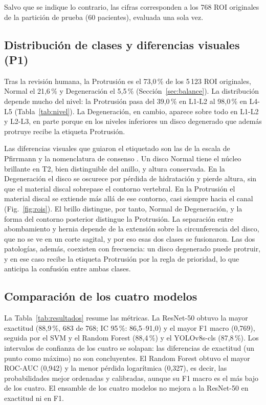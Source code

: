 Salvo que se indique lo contrario, las cifras corresponden a los 768 ROI originales de la partición de prueba (60 pacientes), evaluada una sola vez.

\subsection{Distribución de clases y diferencias visuales (P1)}
\label{sec:res_p1}
Tras la revisión humana, la Protrusión es el 73,0\,\% de los 5\,123 ROI originales, Normal el 21,6\,\% y Degeneración el 5,5\,\% (Sección~\ref{sec:balance}). La distribución depende mucho del nivel: la Protrusión pasa del 39,0\,\% en L1-L2 al 98,0\,\% en L4-L5 (Tabla~\ref{tab:nivel}). La Degeneración, en cambio, aparece sobre todo en L1-L2 y L2-L3, en parte porque en los niveles inferiores un disco degenerado que además protruye recibe la etiqueta Protrusión.

Las diferencias visuales que guiaron el etiquetado son las de la escala de Pfirrmann y la nomenclatura de consenso \cite{pfirrmann2001,fardon2014}. Un disco Normal tiene el núcleo brillante en T2, bien distinguible del anillo, y altura conservada. En la Degeneración el disco se oscurece por pérdida de hidratación y pierde altura, sin que el material discal sobrepase el contorno vertebral. En la Protrusión el material discal se extiende más allá de ese contorno, casi siempre hacia el canal (Fig.~\ref{fig:rois}). El brillo distingue, por tanto, Normal de Degeneración, y la forma del contorno posterior distingue la Protrusión. La separación entre abombamiento y hernia depende de la extensión sobre la circunferencia del disco, que no se ve en un corte sagital, y por eso esas dos clases se fusionaron. Las dos patologías, además, coexisten con frecuencia: un disco degenerado puede protruir, y en ese caso recibe la etiqueta Protrusión por la regla de prioridad, lo que anticipa la confusión entre ambas clases.

\subsection{Comparación de los cuatro modelos}
\label{sec:res_comparacion}
La Tabla~\ref{tab:resultados} resume las métricas. La ResNet-50 obtuvo la mayor exactitud (88,9\,\%, 683 de 768; IC 95\,\%: 86,5--91,0) y el mayor F1 macro (0,769), seguida por el SVM y el Random Forest (88,4\,\%) y el YOLOv8s-cls (87,8\,\%). Los intervalos de confianza de los cuatro se solapan: las diferencias de exactitud (un punto como máximo) no son concluyentes. El Random Forest obtuvo el mayor ROC-AUC (0,942) y la menor pérdida logarítmica (0,327), es decir, las probabilidades mejor ordenadas y calibradas, aunque su F1 macro es el más bajo de los cuatro. El ensamble de los cuatro modelos no mejora a la ResNet-50 en exactitud ni en F1.

